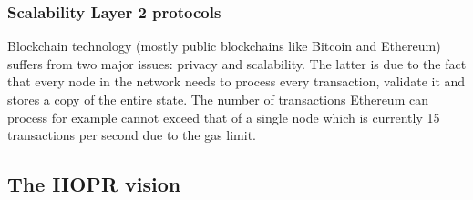 \subsubsection{Scalability Layer 2 protocols}
Blockchain technology (mostly public blockchains like Bitcoin and Ethereum) suffers from two major issues: privacy and scalability. The latter is due to the fact that every node in the network needs to process every transaction, validate it and stores a copy of the entire state. The number of transactions Ethereum can process for example cannot exceed that of a single node which is currently 15 transactions per second due to the gas limit.
\subsection{The HOPR vision}
